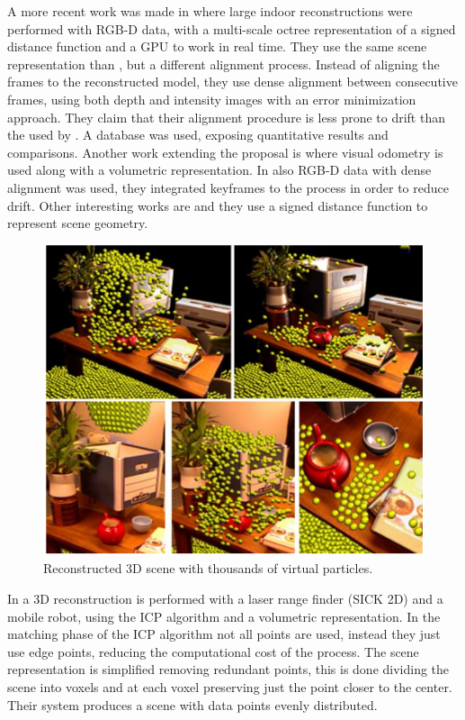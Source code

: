 A more recent work was made in \cite{Steinbrucker_2013_ICCV} where large indoor reconstructions were performed 
with RGB-D data, with a multi-scale octree representation of a signed distance function and a GPU to work in real time. They use 
the same scene representation than  \cite{izadi}, but a different alignment process. Instead of aligning the frames to the reconstructed 
model, they use dense alignment between consecutive frames, 
using both depth and intensity images with an error  minimization approach. They claim that their alignment procedure is less prone to drift than
 the used by \cite{izadi}. A database was used, exposing quantitative results and comparisons. Another work 
extending the \cite{izadi} proposal is \cite{Whelan13} where visual odometry is used along with a volumetric representation. In \cite{KerlSC13} also RGB-D data with dense alignment was used, they integrated keyframes to the process in order to reduce drift. Other 
interesting works are \cite{bylow-sturm-etal} and \cite{quadrocopter} they use a signed distance function to represent scene geometry. 


\begin{figure}[h]
\begin{center}
\includegraphics[scale=0.34]{images/izadi}
\caption{Reconstructed 3D scene with thousands of virtual particles.}
\label{fig:izadi}
\end{center}
\end{figure}


In \cite{keqiang} a 3D reconstruction is performed with a laser range finder (SICK 2D) and a mobile robot, 
using the ICP algorithm and a volumetric representation. In the matching phase of the ICP algorithm not all
 points are used, instead they just use edge points, reducing the computational cost of the process. The scene 
 representation is simplified removing redundant points, this is done dividing the scene into voxels and at each 
 voxel preserving just the point closer to the center. Their system produces a scene with data points evenly 
 distributed.

